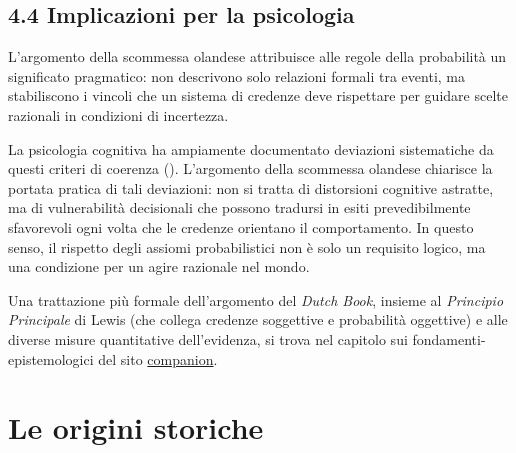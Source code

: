 \documentclass[
  italian,
  letterpaper,
  a4paper,
  11pt,
  open=any]{scrbook}
\theoremstyle{plain}
\theoremstyle{definition}
\theoremstyle{definition}
\theoremstyle{remark}
\begin{document}
\subsection{4.4 Implicazioni per la
psicologia}\label{implicazioni-per-la-psicologia}

L'argomento della scommessa olandese attribuisce alle regole della
probabilità un significato pragmatico: non descrivono solo relazioni
formali tra eventi, ma stabiliscono i vincoli che un sistema di credenze
deve rispettare per guidare scelte razionali in condizioni di
incertezza.

La psicologia cognitiva ha ampiamente documentato deviazioni
sistematiche da questi criteri di coerenza
().
L'argomento della scommessa olandese chiarisce la portata pratica di
tali deviazioni: non si tratta di distorsioni cognitive astratte, ma di
vulnerabilità decisionali che possono tradursi in esiti prevedibilmente
sfavorevoli ogni volta che le credenze orientano il comportamento. In
questo senso, il rispetto degli assiomi probabilistici non è solo un
requisito logico, ma una condizione per un agire razionale nel mondo.

\begin{tcolorbox}[enhanced jigsaw, arc=.35mm, bottomrule=.15mm, bottomtitle=1mm, breakable, colback=white, colbacktitle=quarto-callout-tip-color!10!white, colframe=quarto-callout-tip-color-frame, coltitle=black, left=2mm, leftrule=.75mm, opacityback=0, opacitybacktitle=0.6, rightrule=.15mm, title=\textcolor{quarto-callout-tip-color}{\faLightbulb}\hspace{0.5em}{Per approfondire}, titlerule=0mm, toprule=.15mm, toptitle=1mm]

Una trattazione più formale dell'argomento del \emph{Dutch Book},
insieme al \emph{Principio Principale} di Lewis (che collega credenze
soggettive e probabilità oggettive) e alle diverse misure quantitative
dell'evidenza, si trova nel capitolo sui fondamenti-epistemologici del
sito \href{https://ccaudek.github.io/utet-companion/}{companion}.

\end{tcolorbox}

\section{Le origini storiche}\label{le-origini-storiche}
\end{document}
